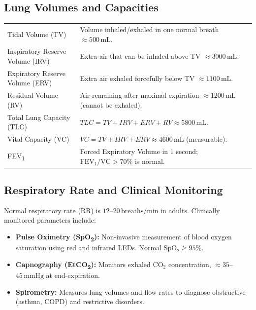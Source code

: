 \documentclass[12pt,a4paper]{article}
\renewcommand{\arraystretch}{1.45}
\begin{document}
\subsection{Lung Volumes and Capacities}

\begin{tcolorbox}[formulabox, title={\textbf{Lung Volume Parameters}}]
\renewcommand{\arraystretch}{1.3}
\begin{tabularx}{\linewidth}{B{4.2cm} X}
Tidal Volume (TV)               & Volume inhaled/exhaled in one normal breath $\approx 500\,\text{mL}$. \\[4pt]
Inspiratory Reserve Volume (IRV)& Extra air that can be inhaled above TV $\approx 3000\,\text{mL}$. \\[4pt]
Expiratory Reserve Volume (ERV) & Extra air exhaled forcefully below TV $\approx 1100\,\text{mL}$. \\[4pt]
Residual Volume (RV)            & Air remaining after maximal expiration $\approx 1200\,\text{mL}$ (cannot be exhaled). \\[4pt]
Total Lung Capacity (TLC)       & $TLC = TV + IRV + ERV + RV \approx 5800\,\text{mL}$. \\[4pt]
Vital Capacity (VC)             & $VC = TV + IRV + ERV \approx 4600\,\text{mL}$ (measurable). \\[4pt]
FEV\textsubscript{1}           & Forced Expiratory Volume in 1 second; $\text{FEV}_1/\text{VC} > 70\%$ is normal.
\end{tabularx}
\end{tcolorbox}

\subsection{Respiratory Rate and Clinical Monitoring}

Normal respiratory rate (RR) is $12$--$20\,\text{breaths/min}$ in adults. Clinically monitored parameters include:
\begin{itemize}[leftmargin=*, itemsep=2pt]
  \item \textbf{Pulse Oximetry (SpO\textsubscript{2}):} Non-invasive measurement of blood oxygen saturation using red and infrared LEDs. Normal SpO$_2 \geq 95\%$.
  \item \textbf{Capnography (EtCO\textsubscript{2}):} Monitors exhaled $\text{CO}_2$ concentration, $\approx 35$--$45\,\text{mmHg}$ at end-expiration.
  \item \textbf{Spirometry:} Measures lung volumes and flow rates to diagnose obstructive (asthma, COPD) and restrictive disorders.
\end{itemize}
\end{document}
